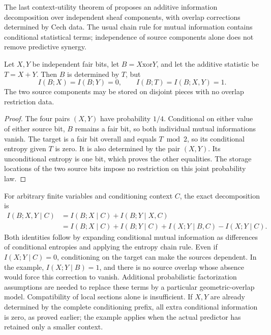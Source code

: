 The last context-utility theorem of \citet{ToricAuditMemory2026} proposes
an additive information decomposition over independent sheaf components,
with overlap corrections determined by Cech data. The usual chain rule
for mutual information contains conditional statistical terms; independence
of source components alone does not remove predictive synergy.

\begin{proposition}
\label{prop:context-xor-synergy}
Let $X,Y$ be independent fair bits, let $B=X\mathbin{\mathrm{xor}}Y$,
and let the additive statistic be $T=X+Y$. Then $B$ is determined by
$T$, but
\[
 I(B;X)=I(B;Y)=0,\qquad
 I(B;T)=I(B;X,Y)=1.
\]
The two source components may be stored on disjoint pieces with no
overlap restriction data.
\end{proposition}
\begin{proof}
The four pairs $(X,Y)$ have probability $1/4$. Conditional on either
value of either source bit, $B$ remains a fair bit, so both individual
mutual informations vanish. The target is a fair bit overall and equals
$T\bmod2$, so its conditional entropy given $T$ is zero. It is also
determined by the pair $(X,Y)$. Its unconditional entropy is one bit,
which proves the other equalities. The storage locations of the two
source bits impose no restriction on this joint probability law.
\end{proof}

For arbitrary finite variables and conditioning context $C$, the exact
decomposition is
\begin{align*}
 I(B;X,Y\mid C)
 &=I(B;X\mid C)+I(B;Y\mid X,C)\\
 &=I(B;X\mid C)+I(B;Y\mid C)
   +I(X;Y\mid B,C)-I(X;Y\mid C).
\end{align*}
Both identities follow by expanding conditional mutual information as
differences of conditional entropies and applying the entropy chain rule.
Even if $I(X;Y\mid C)=0$, conditioning on the target can make the
sources dependent. In the example, $I(X;Y\mid B)=1$, and there is
no source overlap whose absence would force this correction to vanish.
Additional probabilistic factorization assumptions are needed to replace
these terms by a particular geometric-overlap model. Compatibility of local
sections alone is insufficient. If $X,Y$ are already determined by the
complete conditioning prefix, all extra conditional information is zero,
as proved earlier; the example applies when the actual predictor has
retained only a smaller context.

